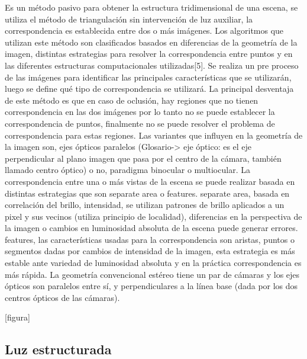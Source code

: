 Es un método pasivo para obtener la estructura tridimensional de una escena, se utiliza el método de triangulación sin intervención de luz auxiliar, la correspondencia es establecida entre dos o más imágenes.
Los algoritmos que utilizan este método son clasificados basados en diferencias de la geometría de la imagen, distintas estrategias para resolver la correspondencia entre puntos y en las diferentes estructuras computacionales utilizadas[5].
Se realiza un pre proceso de las imágenes para identificar las principales características que se utilizarán, luego se define qué tipo de correspondencia se utilizará.
La principal desventaja de este método es que en caso de oclusión, hay regiones que no tienen correspondencia en las dos imágenes por lo tanto no se puede establecer la correspondencia de puntos, finalmente no se puede resolver el problema de correspondencia para estas regiones.
Las variantes que influyen en la geometría de la imagen son, ejes ópticos paralelos (Glosario-> eje óptico: es el eje perpendicular al plano imagen que pasa por el centro de la cámara, también llamado centro óptico) o no, paradigma binocular o multiocular.
La correspondencia entre una o más vistas de la escena se puede realizar basada en distintas estrategias que son separate area o features.
   separate area, basada en correlación del brillo, intensidad, se utilizan patrones de brillo aplicados a un pixel y sus vecinos (utiliza principio de localidad), diferencias en la perspectiva de la imagen o cambios en luminosidad absoluta de la escena puede generar errores.
   features, las características usadas para la correspondencia son aristas, puntos o segmentos dadas por cambios de intensidad de la imagen, esta estrategia es más estable  ante variedad de luminosidad absoluta y en la práctica correspondencia es más rápida.
La geometría convencional estéreo tiene un par de cámaras y los ejes ópticos son paralelos entre sí, y perpendiculares a la línea base (dada por los dos centros ópticos de las cámaras).

[figura]

\subsection{Luz estructurada}

